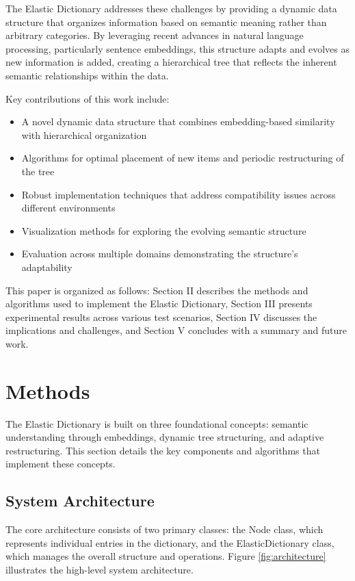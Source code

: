 \documentclass[conference]{IEEEtran}
\begin{document}
The Elastic Dictionary addresses these challenges by providing a dynamic data structure that organizes information based on semantic meaning rather than arbitrary categories. By leveraging recent advances in natural language processing, particularly sentence embeddings, this structure adapts and evolves as new information is added, creating a hierarchical tree that reflects the inherent semantic relationships within the data.

Key contributions of this work include:

\begin{itemize}
    \item A novel dynamic data structure that combines embedding-based similarity with hierarchical organization
    \item Algorithms for optimal placement of new items and periodic restructuring of the tree
    \item Robust implementation techniques that address compatibility issues across different environments
    \item Visualization methods for exploring the evolving semantic structure
    \item Evaluation across multiple domains demonstrating the structure's adaptability
\end{itemize}

This paper is organized as follows: Section II describes the methods and algorithms used to implement the Elastic Dictionary, Section III presents experimental results across various test scenarios, Section IV discusses the implications and challenges, and Section V concludes with a summary and future work.

\section{Methods}

The Elastic Dictionary is built on three foundational concepts: semantic understanding through embeddings, dynamic tree structuring, and adaptive restructuring. This section details the key components and algorithms that implement these concepts.

\subsection{System Architecture}

The core architecture consists of two primary classes: the Node class, which represents individual entries in the dictionary, and the ElasticDictionary class, which manages the overall structure and operations. Figure \ref{fig:architecture} illustrates the high-level system architecture.
\end{document}
